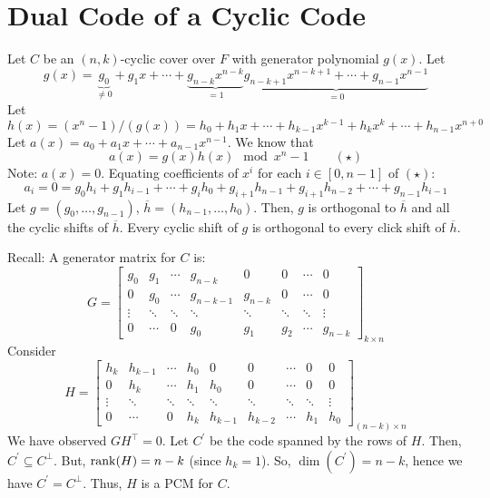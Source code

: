 \section{Dual Code of a Cyclic Code}
Let $ C $ be an $ (n,k) $-cyclic cover over $ F $ with generator
polynomial $ g(x) $. Let
\[ g(x)=\underbrace{g_0}_{\neq 0}+g_1x+\cdots+\underbrace{g_{n-k}x^{n-k}}_{=1}
    \underbrace{g_{n-k+1}x^{n-k+1}+\cdots+g_{n-1}x^{n-1}}_{=0} \]
Let
\[ h(x)=(x^n-1)/(g(x))=h_0+h_1x+\cdots+h_{k-1}x^{k-1}+h_kx^k+\cdots+h_{n-1}x^{n+0} \]
Let $ a(x)=a_0+a_1x+\cdots+a_{n-1}x^{n-1} $. We know that
\[ a(x)=g(x)h(x)\mod x^n-1 \qquad (\star) \]
Note: $ a(x)=0 $. Equating coefficients of $ x^i $ for each $ i\in [0,n-1] $
of $ (\star) $:
\[ a_i=0=g_0h_i+g_1h_{i-1}+\cdots+g_ih_0+g_{i+1}h_{n-1}
    +g_{i+1}h_{n-2}+\cdots+g_{n-1}h_{i-1} \]
Let $ g=(g_0,\ldots ,g_{n-1}) $, $ \overline{h}=(h_{n-1},\ldots ,h_0) $.
Then, $ g $ is orthogonal to $ \overline{h} $ and all the cyclic shifts
of $ \overline{h} $. Every cyclic shift of $ g $ is orthogonal to
every click shift of $ \overline{h} $.

Recall: A generator matrix for $ C $ is:
\[ G=
    \left[
        \begin{array}{cccccccc}
            g_{0}  & g_{1}  & \cdots & g_{n-k}   & 0       & 0      & \cdots & 0       \\
            0      & g_{0}  & \cdots & g_{n-k-1} & g_{n-k} & 0      & \cdots & 0       \\
            \vdots & \ddots & \ddots & \ddots    & \ddots  & \ddots & \ddots & \vdots  \\
            0      & \cdots & 0      & g_{0}     & g_{1}   & g_{2}  & \cdots & g_{n-k}
        \end{array}
        \right]_{k \times n} \]
Consider
\[ H=
    \left[
        \begin{array}{ccccccccc}
            h_{k}  & h_{k-1} & \cdots & h_{0}  & 0       & 0       & \cdots & 0      & 0      \\
            0      & h_{k}   & \cdots & h_{1}  & h_{0}   & 0       & \cdots & 0      & 0      \\
            \vdots & \ddots  & \ddots & \ddots & \ddots  & \ddots  & \ddots & \ddots & \vdots \\
            0      & \cdots  & 0      & h_{k}  & h_{k-1} & h_{k-2} & \cdots & h_{1}  & h_{0}
        \end{array}
        \right]_{(n-k) \times n} \]
We have observed $ GH^{\top}=0 $. Let $ C^{\prime} $ be the code
spanned by the rows of $ H $. Then, $ C^{\prime}\subseteq C^{\perp} $.
But, $ \operatorname{rank}(H)=n-k $ (since $ h_k=1 $). So, $ \dim(C^\prime)=n-k $,
hence we have $ C^\prime=C^{\perp} $. Thus, $ H $ is a PCM for $ C $.

